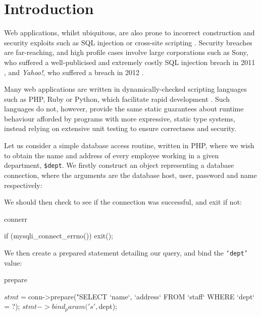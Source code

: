 \section{Introduction}

Web applications, whilst ubiquitous, are also prone to incorrect construction
and security exploits such as SQL injection \cite{owasp:sqli} or cross-site
scripting \cite{owasp:xss}. Security breaches are
far-reaching, and high profile cases involve large corporations such as Sony,
who suffered a well-publicised and extremely costly SQL injection breach in
2011 \cite{ieee:sony}, and \textit{Yahoo!}, who suffered a breach in 2012
\cite{imperva:yahoo}. 

Many web applications are written in dynamically-checked scripting languages
such as PHP, Ruby or Python, which facilitate rapid development
\cite{w3techs:webpls}. Such languages do not, however, provide the same static 
guarantees about runtime behaviour afforded by
programs with more expressive, static type systems, instead relying on
extensive unit testing to ensure correctness and security. 

Let us consider a simple database access routine, written in
PHP, where we wish to obtain the name and address of every employee working in
a given department, \texttt{\$dept}. We firstly construct an object
representing a database connection, where the arguments are the database host,
user, password and name respectively:


\noindent
We should then check to see if the connection was successful, and exit
if not:

\begin{SaveVerbatim}{connerr}

if (mysqli_connect_errno()) { exit(); }

\end{SaveVerbatim}

\noindent
We then create a prepared statement detailing our query, and bind the
\texttt{`dept'} value:

\begin{SaveVerbatim}{prepare}

  $stmt = $conn->prepare("SELECT `name`, `address` 
     FROM `staff` WHERE `dept` = ?);
  $stmt->bind_param('s', $dept);

\end{SaveVerbatim}

